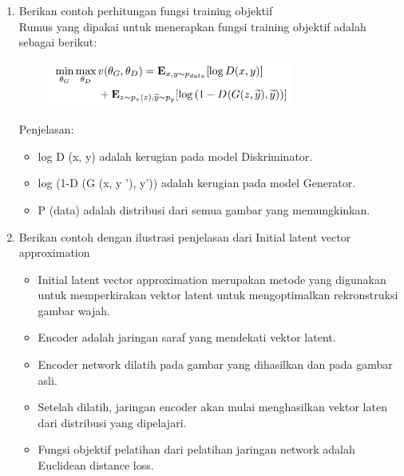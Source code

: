 \begin{enumerate}
    \item Berikan contoh perhitungan fungsi training objektif\\
    Rumus yang dipakai untuk menerapkan fungsi training objektif adalah sebagai berikut:
    \begin{figure}[H]
		\includegraphics[width=8cm]{figures/1174006/chapter9/teori/tof.png}
		\centering
    \end{figure}
    Penjelasan:\\
    \begin{itemize}
        \item log D (x, y) adalah kerugian pada model Diskriminator.
        \item log (1-D (G (x, y ’), y’)) adalah kerugian pada model Generator.
        \item P (data) adalah distribusi dari semua gambar yang memungkinkan.
    \end{itemize}

    \item Berikan contoh dengan ilustrasi penjelasan dari Initial latent vector approximation
    \begin{itemize}
        \item Initial latent vector approximation merupakan metode yang digunakan untuk memperkirakan vektor latent untuk mengoptimalkan rekronstruksi gambar wajah.
        \item Encoder adalah jaringan saraf yang mendekati vektor latent.
        \item Encoder network dilatih pada gambar yang dihasilkan dan pada gambar asli.
        \item Setelah dilatih, jaringan encoder akan mulai menghasilkan vektor laten dari distribusi yang dipelajari.
        \item Fungsi objektif pelatihan dari pelatihan jaringan network adalah Euclidean distance loss.
    \end{itemize}


\end{enumerate}
